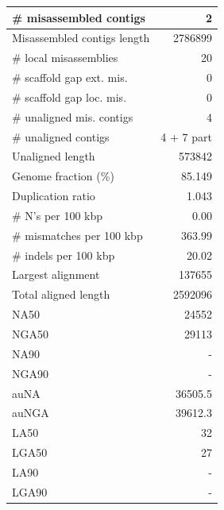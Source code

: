 \documentclass[12pt,a4paper]{article}
\begin{document}
\begin{table}[ht]
\begin{center}
\begin{tabular}{|l*{1}{|r}|}
\# misassembled contigs & 2 \\ \hline
Misassembled contigs length & 2786899 \\ \hline
\# local misassemblies & 20 \\ \hline
\# scaffold gap ext. mis. & 0 \\ \hline
\# scaffold gap loc. mis. & 0 \\ \hline
\# unaligned mis. contigs & 4 \\ \hline
\# unaligned contigs & 4 + 7 part \\ \hline
Unaligned length & 573842 \\ \hline
Genome fraction (\%) & 85.149 \\ \hline
Duplication ratio & 1.043 \\ \hline
\# N's per 100 kbp & 0.00 \\ \hline
\# mismatches per 100 kbp & 363.99 \\ \hline
\# indels per 100 kbp & 20.02 \\ \hline
Largest alignment & 137655 \\ \hline
Total aligned length & 2592096 \\ \hline
NA50 & 24552 \\ \hline
NGA50 & 29113 \\ \hline
NA90 & - \\ \hline
NGA90 & - \\ \hline
auNA & 36505.5 \\ \hline
auNGA & 39612.3 \\ \hline
LA50 & 32 \\ \hline
LGA50 & 27 \\ \hline
LA90 & - \\ \hline
LGA90 & - \\ \hline
\end{tabular}
\end{center}
\end{table}
\end{document}
